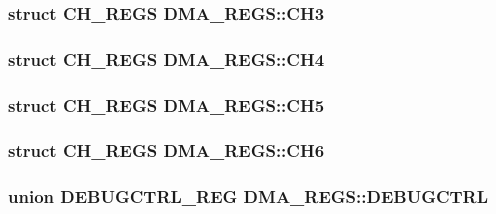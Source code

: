 \subsubsection[{C\+H3}]{\setlength{\rightskip}{0pt plus 5cm}struct {\bf C\+H\+\_\+\+R\+E\+G\+S} D\+M\+A\+\_\+\+R\+E\+G\+S\+::\+C\+H3}\label{struct_d_m_a___r_e_g_s_a3a41df23bd86562c20efe2e44f51f828}
\hypertarget{struct_d_m_a___r_e_g_s_a8835bb9e0185cd821eedb17e36a27e0a}{}
\subsubsection[{C\+H4}]{\setlength{\rightskip}{0pt plus 5cm}struct {\bf C\+H\+\_\+\+R\+E\+G\+S} D\+M\+A\+\_\+\+R\+E\+G\+S\+::\+C\+H4}\label{struct_d_m_a___r_e_g_s_a8835bb9e0185cd821eedb17e36a27e0a}
\hypertarget{struct_d_m_a___r_e_g_s_ab036e997a1f2d95a58d567b36824eb1c}{}
\subsubsection[{C\+H5}]{\setlength{\rightskip}{0pt plus 5cm}struct {\bf C\+H\+\_\+\+R\+E\+G\+S} D\+M\+A\+\_\+\+R\+E\+G\+S\+::\+C\+H5}\label{struct_d_m_a___r_e_g_s_ab036e997a1f2d95a58d567b36824eb1c}
\hypertarget{struct_d_m_a___r_e_g_s_a72dbb6a73cf9543c2d4fdf3f270eee4f}{}
\subsubsection[{C\+H6}]{\setlength{\rightskip}{0pt plus 5cm}struct {\bf C\+H\+\_\+\+R\+E\+G\+S} D\+M\+A\+\_\+\+R\+E\+G\+S\+::\+C\+H6}\label{struct_d_m_a___r_e_g_s_a72dbb6a73cf9543c2d4fdf3f270eee4f}
\hypertarget{struct_d_m_a___r_e_g_s_a2409ad5399be6b14c47b1340b6eaa70f}{}
\subsubsection[{D\+E\+B\+U\+G\+C\+T\+R\+L}]{\setlength{\rightskip}{0pt plus 5cm}union {\bf D\+E\+B\+U\+G\+C\+T\+R\+L\+\_\+\+R\+E\+G} D\+M\+A\+\_\+\+R\+E\+G\+S\+::\+D\+E\+B\+U\+G\+C\+T\+R\+L}\label{struct_d_m_a___r_e_g_s_a2409ad5399be6b14c47b1340b6eaa70f}
\hypertarget{struct_d_m_a___r_e_g_s_a9823fc4d7b594208d8e216eb19ed649c}{}
